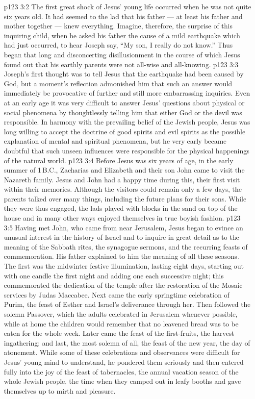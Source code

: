 \vs p123 3:2 \pc The first great shock of Jesus’ young life occurred when he was not quite six years old. It had seemed to the lad that his father --- at least his father and mother together --- knew everything. Imagine, therefore, the surprise of this inquiring child, when he asked his father the cause of a mild earthquake which had just occurred, to hear Joseph say, “My son, I really do not know.” Thus began that long and disconcerting disillusionment in the course of which Jesus found out that his earthly parents were not all\hyp{}wise and all\hyp{}knowing.
\vs p123 3:3 Joseph’s first thought was to tell Jesus that the earthquake had been caused by God, but a moment’s reflection admonished him that such an answer would immediately be provocative of further and still more embarrassing inquiries. Even at an early age it was very difficult to answer Jesus’ questions about physical or social phenomena by thoughtlessly telling him that either God or the devil was responsible. In harmony with the prevailing belief of the Jewish people, Jesus was long willing to accept the doctrine of good spirits and evil spirits as the possible explanation of mental and spiritual phenomena, but he very early became doubtful that such unseen influences were responsible for the physical happenings of the natural world.
\vs p123 3:4 \pc Before Jesus was six years of age, in the early summer of 1\,B.C., Zacharias and Elizabeth and their son John came to visit the Nazareth family. Jesus and John had a happy time during this, their first visit within their memories. Although the visitors could remain only a few days, the parents talked over many things, including the future plans for their sons. While they were thus engaged, the lads played with blocks in the sand on top of the house and in many other ways enjoyed themselves in true boyish fashion.
\vs p123 3:5 \pc Having met John, who came from near Jerusalem, Jesus began to evince an unusual interest in the history of Israel and to inquire in great detail as to the meaning of the Sabbath rites, the synagogue sermons, and the recurring feasts of commemoration. His father explained to him the meaning of all these seasons. The first was the midwinter festive illumination, lasting eight days, starting out with one candle the first night and adding one each successive night; this commemorated the dedication of the temple after the restoration of the Mosaic services by Judas Maccabee. Next came the early springtime celebration of Purim, the feast of Esther and Israel’s deliverance through her. Then followed the solemn Passover, which the adults celebrated in Jerusalem whenever possible, while at home the children would remember that no leavened bread was to be eaten for the whole week. Later came the feast of the first\hyp{}fruits, the harvest ingathering; and last, the most solemn of all, the feast of the new year, the day of atonement. While some of these celebrations and observances were difficult for Jesus’ young mind to understand, he pondered them seriously and then entered fully into the joy of the feast of tabernacles, the annual vacation season of the whole Jewish people, the time when they camped out in leafy booths and gave themselves up to mirth and pleasure.
